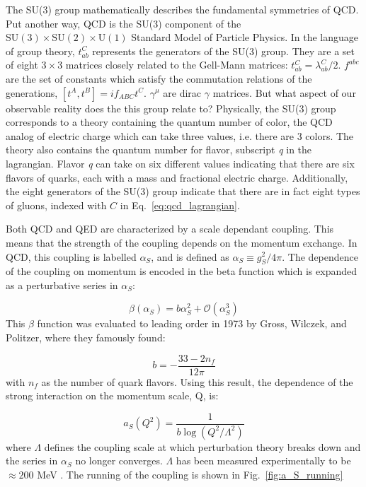 The SU(3) group mathematically describes the fundamental symmetries of QCD. Put another way, QCD is the SU(3) component of the $\mathrm{SU(3)}\times\mathrm{SU(2)}\times\mathrm{U(1)}$ Standard Model of Particle Physics. In the language of group theory, $t_{ab}^C$ represents the generators of the SU(3) group. They are a set of eight $3\times3$ matrices closely related to the Gell-Mann matrices: $t_{ab}^C = \lambda_{ab}^C/2$. $f^{abc}$ are the set of constants which satisfy the commutation relations of the generations, $[t^A,t^B] = if_{ABC}t^C$. $\gamma^\mu$ are dirac $\gamma$ matrices.
But what aspect of our observable reality does the this group relate to? Physically, the SU(3) group corresponds to a theory containing the quantum number of color, the QCD analog of electric charge which can take three values, i.e. there are 3 colors. The theory also contains the quantum number for flavor, subscript \textit{q} in the lagrangian. Flavor \textit{q} can take on six different values indicating that there are six flavors of quarks, each with a mass and  fractional electric charge. Additionally, the eight generators of the SU(3) group indicate that there are in fact eight types of gluons, indexed with $C$ in Eq.~\ref{eq:qcd_lagrangian}.
 
Both QCD and QED are characterized by a scale dependant coupling. This means that the strength of the coupling depends on the momentum exchange. In QCD, this coupling is labelled $\alpha_S$, 
and is defined as  $\alpha_S \equiv g_S^2/4\pi$. The dependence of the 
coupling on momentum is encoded in the beta function which is expanded as a perturbative series in $\alpha_S$:

\begin{equation}
  \beta(\alpha_S) = b\alpha_S^2+\mathcal{O}(\alpha_S^3) 
  \label{eq:beta}
\end{equation}
This $\beta$ function was evaluated to leading order in 1973 by Gross, Wilczek, and Politzer, \cite{Gross1973,Politzer1973}where they famously found:

  \begin{equation}
    b =  -\frac{33 - 2n_f}{12\pi} 
    \label{eq:b}
  \end{equation}
with $n_f$ as the number of quark flavors. Using this result, the dependence of the strong interaction on the momentum scale, Q, is:

  \begin{equation}
    a_S(Q^2) = \frac{1}{b\log(Q^2/\Lambda^2)}
  \label{eq:a_S_running}
  \end{equation}
where $\Lambda$ defines the coupling scale at which perturbation theory breaks down and the series in  $\alpha_S$ no longer converges. $\Lambda$ has been measured experimentally to be  $\approx 200$ MeV \cite{Bettini2008}. The running of the coupling is shown in Fig.~\ref{fig:a_S_running}

